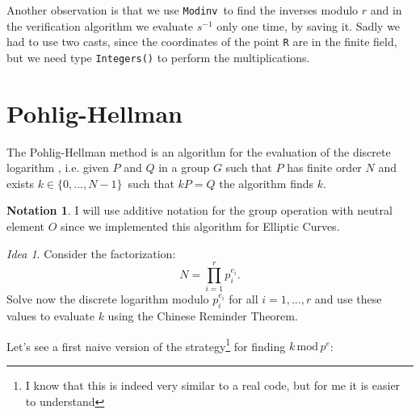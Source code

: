 \documentclass{article}
\theoremstyle{plain}
\theoremstyle{remark}
\newtheorem{idea}[rem]{Idea}
\theoremstyle{definition}
\newtheorem*{nota}{Notation}
\begin{document}
Another observation is that we use \texttt{Modinv} to find the inverses modulo $r$ and in the verification algorithm we evaluate $s^{-1}$ only one time, by saving it. Sadly we had to use two casts, since the coordinates of the point \texttt{R} are in the finite field, but we need type \texttt{Integers()} to perform the multiplications. 




\section{Pohlig-Hellman}

The Pohlig-Hellman method is an algorithm for the evaluation of the discrete logarithm %
, i.e. given $P$ and $Q$ in a group $G$ such that $P$ has finite order $N$ and exists $k\in \{0,...,N-1\}$ such that $kP = Q$ the algorithm finds $k$. 

\begin{nota}
	I will use additive notation for the group operation with neutral element $O$ since we implemented this algorithm for Elliptic Curves. 
\end{nota}

\begin{idea} \label{idea:ecdlp}
	Consider the factorization:
\begin{equation*}
	N = \prod_{i=1}^r p_i^{e_i}.
\end{equation*}
	Solve now the discrete logarithm modulo $p_i^{e_i}$ for all $i = 1,...,r$ and use these values to evaluate $k$ using the Chinese Reminder Theorem. 
\end{idea}

Let's see a first naive version of the strategy\footnote{I know that this is indeed very similar to a real code, but for me it is easier to understand} for finding $k \,\text{mod}\, p^e$:
\end{document}
